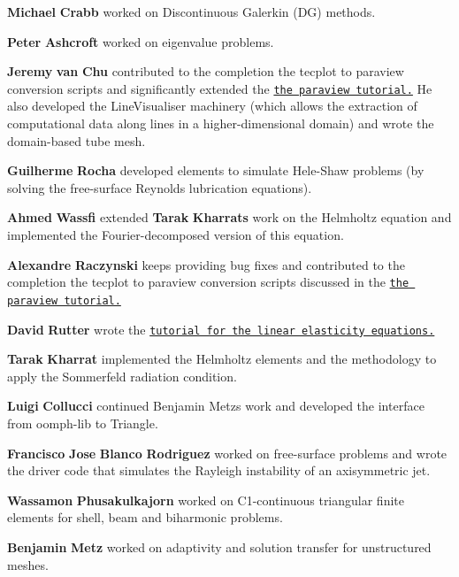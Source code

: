 \begin{DoxyItemize}
\item {\bfseries Michael} {\bfseries Crabb} worked on Discontinuous Galerkin (DG) methods.
\item {\bfseries Peter} {\bfseries Ashcroft} worked on eigenvalue problems.
\item {\bfseries Jeremy} {\bfseries van} {\bfseries Chu} contributed to the completion the tecplot to paraview conversion scripts and significantly extended the \href{../../paraview/html/index.html}{\tt the paraview tutorial.} He also developed the {\ttfamily Line\+Visualiser} machinery (which allows the extraction of computational data along lines in a higher-\/dimensional domain) and wrote the domain-\/based tube mesh.
\item {\bfseries Guilherme} {\bfseries Rocha} developed elements to simulate Hele-\/\+Shaw problems (by solving the free-\/surface Reynolds lubrication equations).
\item {\bfseries Ahmed} {\bfseries Wassfi} extended {\bfseries Tarak} {\bfseries Kharrat\textquotesingle{}s} work on the Helmholtz equation and implemented the Fourier-\/decomposed version of this equation.
\item {\bfseries Alexandre} {\bfseries Raczynski} keeps providing bug fixes and contributed to the completion the tecplot to paraview conversion scripts discussed in the \href{../../paraview/html/index.html}{\tt the paraview tutorial.}
\item {\bfseries David} {\bfseries Rutter} wrote the \href{../../linear_elasticity/periodic_load/html/index.html}{\tt tutorial for the linear elasticity equations.}
\item {\bfseries Tarak} {\bfseries Kharrat} implemented the Helmholtz elements and the methodology to apply the Sommerfeld radiation condition.
\item {\bfseries Luigi} {\bfseries Collucci} continued Benjamin Metz\textquotesingle{}s work and developed the interface from {\ttfamily oomph-\/lib} to {\ttfamily Triangle}.
\item {\bfseries Francisco} {\bfseries Jose} {\bfseries Blanco} {\bfseries Rodriguez} worked on free-\/surface problems and wrote the driver code that simulates the Rayleigh instability of an axisymmetric jet.
\item {\bfseries Wassamon} {\bfseries Phusakulkajorn} worked on C1-\/continuous triangular finite elements for shell, beam and biharmonic problems.
\item {\bfseries Benjamin} {\bfseries Metz} worked on adaptivity and solution transfer for unstructured meshes.

\end{DoxyItemize}
